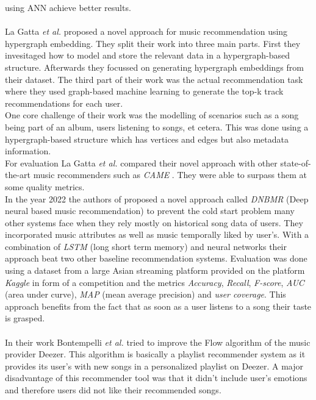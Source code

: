 \documentclass[runningheads,a4paper]{llncs}
\begin{document}
using ANN achieve better results. \cite{niyazov2021content}\\
\\
La Gatta \textit{et al.} proposed a novel approach for music recommendation using hypergraph embedding.
They split their work into three main parts.
First they invesitaged how to model and store the relevant data in a hypergraph-based structure.
Afterwards they focussed on generating hypergraph embeddings from their dataset.
The third part of their work was the actual recommendation task where they used graph-based machine learning to 
generate the top-k track recommendations for each user. \\
One core challenge of their work was the modelling of scenarios such as a song being part of an album, users listening to songs, et cetera.
This was done using a hypergraph-based structure which has vertices and edges but also metadata information.\\
For evaluation La Gatta \textit{et al.} compared their novel approach with other state-of-the-art music recommenders such as \textit{CAME} \cite{wang2020came}.
They were able to surpass them at some quality metrics. \cite{la2022music}
\\
In the year 2022 the authors of 
\cite{singh2022novel} proposed a novel approach called \textit{DNBMR} (Deep neural based music recommendation) 
to prevent the cold start problem many other systems face when they rely mostly on historical song data of users. 
They incorporated music attributes as well as music temporally liked by user's.
With a combination of \textit{LSTM} (long short term memory) and neural networks their approach beat two other baseline recommendation systems.
Evaluation was done using a dataset from a large Asian streaming platform provided on the platform \textit{Kaggle} in form of a competition and the metrics \textit{Accuracy}, \textit{Recall}, \textit{F-score},
\textit{AUC} (area under curve), \textit{MAP} (mean average precision) and \textit{user coverage}. This approach benefits from the fact that as soon as a user listens to a song their taste is grasped.\\
\\
In their work Bontempelli \textit{et al.} tried to improve the Flow algorithm of the music provider Deezer.
This algorithm is basically a playlist recommender system as it provides its user's with new songs in a personalized playlist on Deezer. 
A major disadvantage of this recommender tool was that it didn't include user's emotions and therefore users did not like their recommended songs.
\end{document}
